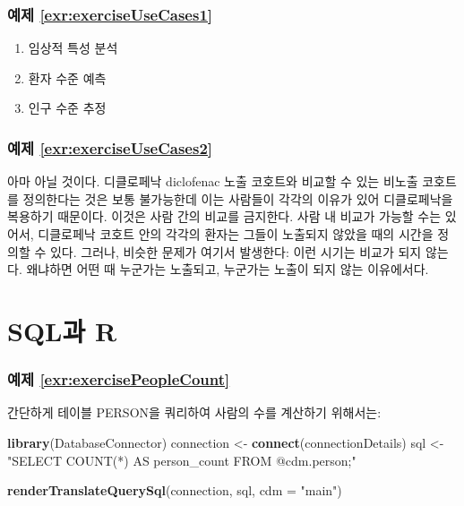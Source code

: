 \documentclass[11pt]{book}
\newenvironment{Shaded}{\begin{snugshade}}{\end{snugshade}}
\newcommand{\KeywordTok}[1]{\textcolor[rgb]{0.13,0.29,0.53}{\textbf{#1}}}
\newcommand{\DataTypeTok}[1]{\textcolor[rgb]{0.13,0.29,0.53}{#1}}
\newcommand{\StringTok}[1]{\textcolor[rgb]{0.31,0.60,0.02}{#1}}
\newcommand{\NormalTok}[1]{#1}
\theoremstyle{definition}
\theoremstyle{definition}
\theoremstyle{definition}
\theoremstyle{remark}
\begin{document}
\subsubsection*{예제
\ref{exr:exerciseUseCases1}}\label{-refexrexerciseusecases1}

\begin{enumerate}
\def\labelenumi{\arabic{enumi}.}
\item
  임상적 특성 분석
\item
  환자 수준 예측
\item
  인구 수준 추정
\end{enumerate}

\subsubsection*{예제
\ref{exr:exerciseUseCases2}}\label{-refexrexerciseusecases2}

아마 아닐 것이다. 디클로페낙 diclofenac 노출 코호트와 비교할 수 있는
비노출 코호트를 정의한다는 것은 보통 불가능한데 이는 사람들이 각각의
이유가 있어 디클로페낙을 복용하기 때문이다. 이것은 사람 간의 비교를
금지한다. 사람 내 비교가 가능할 수는 있어서, 디클로페낙 코호트 안의
각각의 환자는 그들이 노출되지 않았을 때의 시간을 정의할 수 있다. 그러나,
비슷한 문제가 여기서 발생한다: 이런 시기는 비교가 되지 않는다. 왜냐하면
어떤 때 누군가는 노출되고, 누군가는 노출이 되지 않는 이유에서다.

\section{SQL과 R}\label{SqlAndRanswers}

\subsubsection*{예제
\ref{exr:exercisePeopleCount}}\label{-refexrexercisepeoplecount}

간단하게 테이블 PERSON을 쿼리하여 사람의 수를 계산하기 위해서는:

\begin{Shaded}
\begin{Highlighting}[]
\KeywordTok{library}\NormalTok{(DatabaseConnector)}
\NormalTok{connection <-}\StringTok{ }\KeywordTok{connect}\NormalTok{(connectionDetails)}
\NormalTok{sql <-}\StringTok{ "SELECT COUNT(*) AS person_count}
\StringTok{FROM @cdm.person;"}

\KeywordTok{renderTranslateQuerySql}\NormalTok{(connection, sql, }\DataTypeTok{cdm =} \StringTok{"main"}\NormalTok{)}
\end{Highlighting}
\end{Shaded}
\end{document}
